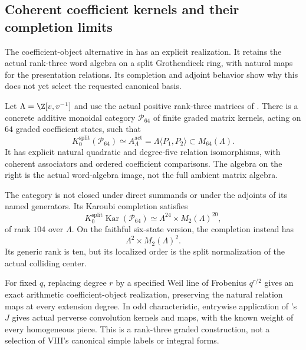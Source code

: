 \subsection{Coherent coefficient kernels and their completion limits}
The coefficient-object alternative in  has an explicit
realization. It retains the actual rank-three word algebra on a
split Grothendieck ring, with natural maps for the presentation
relations. Its completion and adjoint behavior show why this
does not yet select the requested canonical basis.

\begin{finding}
\label{f:coefficientkernelcategory}
Let $\Lambda=\Z[v,v^{-1}]$ and use the actual positive
rank-three matrices of .
There is a concrete additive monoidal category
$\mathcal P_{64}$ of finite graded matrix kernels, acting
on $64$ graded coefficient states, such that
\[
 K_0^{\mathrm{split}}(\mathcal P_{64})
   \simeq A_\Lambda^{\mathrm{act}}
   =\Lambda\langle P_1,P_2\rangle
       \subset M_{64}(\Lambda).
\]
It has explicit natural quadratic and degree-five
relation isomorphisms, with coherent associators and
ordered coefficient comparisons.
The algebra on the right is the actual word-algebra
image, not the full ambient matrix algebra.

The category is not closed under direct summands
or under the adjoints of its named generators.
Its Karoubi completion satisfies
\[
 K_0^{\mathrm{split}}\operatorname{Kar}(\mathcal P_{64})
       \simeq\Lambda^{24}\times M_2(\Lambda)^{20},
\]
of rank $104$ over $\Lambda$.
On the faithful six-state version, the completion instead has
\[
 \Lambda^2\times M_2(\Lambda)^2.
\]
Its generic rank is ten, but its localized order is the
split normalization of the actual colliding center.

For fixed $q$, replacing degree $r$ by a specified Weil
line of Frobenius $q^{r/2}$ gives an exact arithmetic
coefficient-object realization, preserving the natural
relation maps at every extension degree.
In odd characteristic, entrywise application of
's $J$ gives actual perverse convolution kernels
and maps, with the known weight of every homogeneous piece.
This is a rank-three graded construction, not a selection
of VIII's canonical simple labels or integral forms.
\end{finding}

